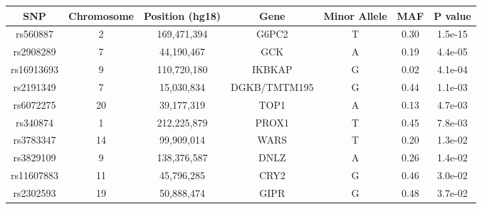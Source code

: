 \begin{table}[ht]
\centering
{\tiny
\begin{tabular}{ccccccc}
  \hline
SNP & Chromosome & Position (hg18) & Gene & Minor Allele & MAF & P value \\ 
  \hline
rs560887 &   2 & 169,471,394 & G6PC2 & T & 0.30 & 1.5e-15 \\ 
  rs2908289 &   7 &  44,190,467 & GCK & A & 0.19 & 4.4e-05 \\ 
  rs16913693 &   9 & 110,720,180 & IKBKAP & G & 0.02 & 4.1e-04 \\ 
  rs2191349 &   7 &  15,030,834 & DGKB/TMTM195 & G & 0.44 & 1.1e-03 \\ 
  rs6072275 &  20 &  39,177,319 & TOP1 & A & 0.13 & 4.7e-03 \\ 
  rs340874 &   1 & 212,225,879 & PROX1 & T & 0.45 & 7.8e-03 \\ 
  rs3783347 &  14 &  99,909,014 & WARS & T & 0.20 & 1.3e-02 \\ 
  rs3829109 &   9 & 138,376,587 & DNLZ & A & 0.26 & 1.4e-02 \\ 
  rs11607883 &  11 &  45,796,285 & CRY2 & G & 0.46 & 3.0e-02 \\ 
  rs2302593 &  19 &  50,888,474 & GIPR & G & 0.48 & 3.7e-02 \\ 
   \hline
\end{tabular}
}
\end{table}
